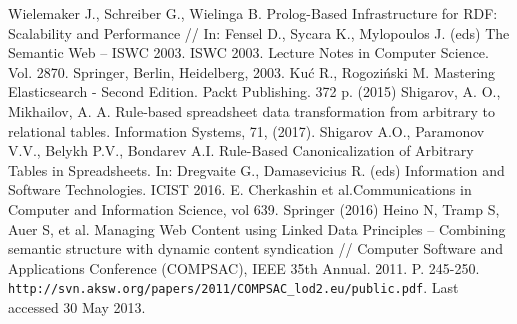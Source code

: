 \documentclass[conference,a4paper]{IEEEtran}
\providecommand\url[1]{\texttt{#1}}
\begin{document}
\begin{thebibliography}{99}
  Wielemaker J., Schreiber G., Wielinga B. Prolog-Based Infrastructure
  for RDF: Scalability and Performance // In: Fensel D., Sycara K.,
  Mylopoulos J. (eds) The Semantic Web -- ISWC 2003. ISWC 2003. Lecture
  Notes in Computer Science. Vol. 2870. Springer, Berlin,
  Heidelberg, 2003.
  Kuć R., Rogoziński M. Mastering Elasticsearch - Second Edition. Packt
  Publishing. 372 p. (2015)
Shigarov, A. O., Mikhailov, A. A. Rule-based spreadsheet data transformation from arbitrary to relational tables. Information Systems, 71, (2017). 
Shigarov A.O., Paramonov V.V., Belykh P.V., Bondarev A.I. Rule-Based Canonicalization of Arbitrary Tables in Spreadsheets. In: Dregvaite G., Damasevicius R. (eds) Information and Software Technologies. ICIST 2016. E. Cherkashin et al.Communications in Computer and Information Science, vol 639. Springer (2016) 
  Heino N, Tramp S, Auer S, et al. Managing Web Content using Linked
  Data Principles -- Combining semantic structure with dynamic content
  syndication // Computer Software and Applications Conference
  (COMPSAC), IEEE 35th Annual. 2011. P. 245-250.
  \url{http://svn.aksw.org/papers/2011/COMPSAC\_lod2.eu/public.pdf}. Last accessed 30 May 2013.
\end{thebibliography}
\end{document}
